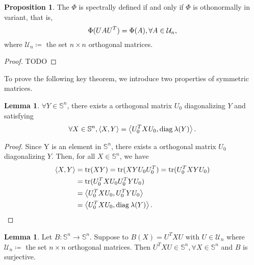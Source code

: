 \documentclass[a4paper,11pt, oneside]{book}
\theoremstyle{definition}
\newtheorem{prop}[dfn]{Proposition}
\newtheorem{lem}[dfn]{Lemma}
\newcommand{\NDemenstionalRealSymmetricMatrixSpace}{\mathbb{S}^n}
\newcommand{\Trace}[1]{\text{\rm tr$({#1})$}} %
\newcommand{\Diagnosis}[1]{\text{\rm diag\:${#1}$}} %
\newcommand{\InnerProduct}[2]{\left\langle {#1},{#2}\right\rangle} %
\begin{document}
\begin{prop}
  The $\Phi$ is spectrally defined if and only if $\Phi$ is othonormally in variant, that is,
  \begin{equation}
    \Phi (UAU^T) = \Phi (A), \forall A \in \mathcal{U}_n, \notag
  \end{equation}
  where $\mathcal{U}_n \coloneqq$ the set $n \times n$ orthogonal matrices.
\end{prop}

\begin{proof}
  TODO
\end{proof}

To prove the following key theorem, we introduce two properties of symmetric matrices.

\begin{lem}\label{lemma1ForLewis96}
  $\forall Y \in \NDemenstionalRealSymmetricMatrixSpace$, there exists a orthogonal matrix $U_0$ diagonalizing $Y$ and satisfying
  \begin{equation}
    \forall X \in \NDemenstionalRealSymmetricMatrixSpace, \InnerProduct{X}{Y} = \InnerProduct{U_0^TXU_0}{\Diagnosis{\lambda (Y)}}. \notag
  \end{equation}
\end{lem}

\begin{proof}
  Since Y is an element in $\NDemenstionalRealSymmetricMatrixSpace$, there exists a orthogonal matrix $U_0$ diagonalizing $Y$. Then, for all $X \in \NDemenstionalRealSymmetricMatrixSpace$, we have
  \begin{equation}
    \begin{split}
      \InnerProduct{X}{Y} &= \Trace{XY} = \Trace{XYU_0U_0^T} = \Trace{U_0^TXYU_0} \\
      &= \Trace{U_0^TXU_0U_0^TYU_0}\\
      &= \InnerProduct{U_0^TXU_0}{U_0^TYU_0}\\
      &= \InnerProduct{U_0^TXU_0}{\Diagnosis{\lambda (Y)}}. \notag
    \end{split}
  \end{equation}
\end{proof}

\begin{lem}\label{lemma2ForLewis96}
  Let $B: \NDemenstionalRealSymmetricMatrixSpace \to \NDemenstionalRealSymmetricMatrixSpace$. Suppose to $B(X) = U^TXU$ with $U \in \mathcal{U}_n$ where $\mathcal{U}_n \coloneqq$ the set $n \times n$ orthogonal matrices. Then $U^TXU \in \NDemenstionalRealSymmetricMatrixSpace, \forall X \in \NDemenstionalRealSymmetricMatrixSpace$ and $B$ is surjective.
\end{lem}
\end{document}
